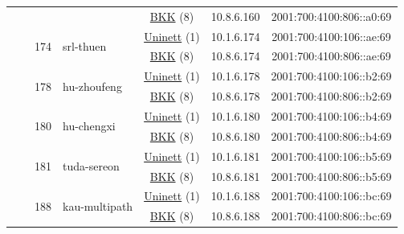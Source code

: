 \begin{small}
\begin{center}
\begin{longtable}{|c|c|c|c|c|c|c|c|}
  &  &  &  & \multicolumn{2}{|c|}{\tiny{\href{http://bkk.no}{BKK} (8)}} & \tiny{10.8.6.160} & \tiny{2001:700:4100:806::a0:69} \\* \cline{3-3}\cline{4-4}\cline{5-5}\cline{6-6}\cline{7-7}\cline{8-8}
  &  & \multirow{2}{*}{\tiny{174}} & \multicolumn{1}{|l|}{\multirow{2}{*}{\tiny{srl-thuen}}} & \multicolumn{2}{|c|}{\tiny{\href{https://www.uninett.no}{Uninett} (1)}} & \tiny{10.1.6.174} & \tiny{2001:700:4100:106::ae:69} \\* \cline{5-5}\cline{6-6}\cline{7-7}\cline{8-8}
  &  &  &  & \multicolumn{2}{|c|}{\tiny{\href{http://bkk.no}{BKK} (8)}} & \tiny{10.8.6.174} & \tiny{2001:700:4100:806::ae:69} \\* \cline{3-3}\cline{4-4}\cline{5-5}\cline{6-6}\cline{7-7}\cline{8-8}
  &  & \multirow{2}{*}{\tiny{178}} & \multicolumn{1}{|l|}{\multirow{2}{*}{\tiny{hu-zhoufeng}}} & \multicolumn{2}{|c|}{\tiny{\href{https://www.uninett.no}{Uninett} (1)}} & \tiny{10.1.6.178} & \tiny{2001:700:4100:106::b2:69} \\* \cline{5-5}\cline{6-6}\cline{7-7}\cline{8-8}
  &  &  &  & \multicolumn{2}{|c|}{\tiny{\href{http://bkk.no}{BKK} (8)}} & \tiny{10.8.6.178} & \tiny{2001:700:4100:806::b2:69} \\* \cline{3-3}\cline{4-4}\cline{5-5}\cline{6-6}\cline{7-7}\cline{8-8}
  &  & \multirow{2}{*}{\tiny{180}} & \multicolumn{1}{|l|}{\multirow{2}{*}{\tiny{hu-chengxi}}} & \multicolumn{2}{|c|}{\tiny{\href{https://www.uninett.no}{Uninett} (1)}} & \tiny{10.1.6.180} & \tiny{2001:700:4100:106::b4:69} \\* \cline{5-5}\cline{6-6}\cline{7-7}\cline{8-8}
  &  &  &  & \multicolumn{2}{|c|}{\tiny{\href{http://bkk.no}{BKK} (8)}} & \tiny{10.8.6.180} & \tiny{2001:700:4100:806::b4:69} \\* \cline{3-3}\cline{4-4}\cline{5-5}\cline{6-6}\cline{7-7}\cline{8-8}
  &  & \multirow{2}{*}{\tiny{181}} & \multicolumn{1}{|l|}{\multirow{2}{*}{\tiny{tuda-sereon}}} & \multicolumn{2}{|c|}{\tiny{\href{https://www.uninett.no}{Uninett} (1)}} & \tiny{10.1.6.181} & \tiny{2001:700:4100:106::b5:69} \\* \cline{5-5}\cline{6-6}\cline{7-7}\cline{8-8}
  &  &  &  & \multicolumn{2}{|c|}{\tiny{\href{http://bkk.no}{BKK} (8)}} & \tiny{10.8.6.181} & \tiny{2001:700:4100:806::b5:69} \\* \cline{3-3}\cline{4-4}\cline{5-5}\cline{6-6}\cline{7-7}\cline{8-8}
  &  & \multirow{2}{*}{\tiny{188}} & \multicolumn{1}{|l|}{\multirow{2}{*}{\tiny{kau-multipath}}} & \multicolumn{2}{|c|}{\tiny{\href{https://www.uninett.no}{Uninett} (1)}} & \tiny{10.1.6.188} & \tiny{2001:700:4100:106::bc:69} \\* \cline{5-5}\cline{6-6}\cline{7-7}\cline{8-8}
  &  &  &  & \multicolumn{2}{|c|}{\tiny{\href{http://bkk.no}{BKK} (8)}} & \tiny{10.8.6.188} & \tiny{2001:700:4100:806::bc:69} \\ \hline
\end{longtable}
\end{center}
\end{small}



